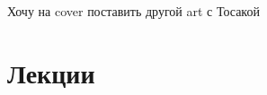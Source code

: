 \documentclass[a4paper]{article}
\begin{document}
  

  \todo Хочу на cover поставить другой art с Тосакой

  \section{Лекции}
  
  
\end{document}
